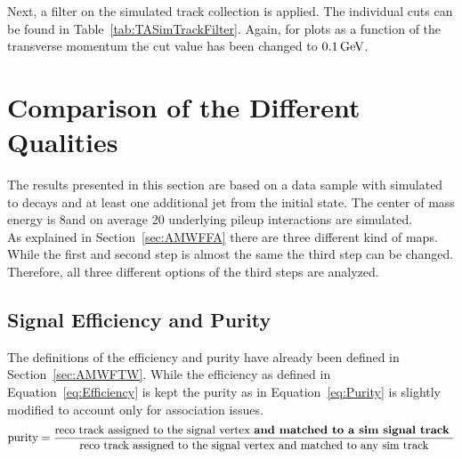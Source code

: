 

Next, a filter on the simulated track collection is applied. The individual cuts can be found in Table~\ref{tab:TASimTrackFilter}. Again, for plots as a function of the transverse momentum the cut value has been changed to $0.1\,\text{Ge\hspace{-.08em}V}$. \\



\section{Comparison of the Different Qualities \label{sec:TASEFRDQ}}

The results presented in this section are based on a data sample with simulated \Zz to \MM decays and at least one additional jet from the initial state. The center of mass energy is 8\TeV and on average 20 underlying pileup interactions are simulated. \\
As explained in Section~\ref{sec:AMWFFA} there are three different kind of maps. While the first and second step is almost the same the third step can be changed. Therefore, all three different options of the third steps are analyzed. 

\subsection{Signal Efficiency and Purity \label{sec:TASEFR}}

The definitions of the efficiency and purity have already been defined in Section~\ref{sec:AMWFTW}. While the efficiency as defined in Equation~\ref{eq:Efficiency} is kept the purity as in Equation~\ref{eq:Purity} is slightly modified to account only for association issues. 
\begin{equation}
\textrm{purity} = \frac{ \textrm{reco track assigned to the signal vertex \textbf{and matched to a sim signal track} } }{ \textrm{reco track assigned to the signal vertex and matched to any sim track} }
\label{eq:AssPurity}
\end{equation}

